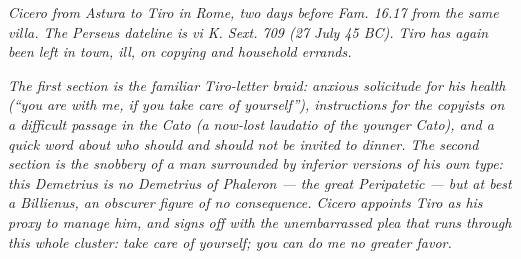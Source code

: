 
\textit{Cicero from Astura to Tiro in Rome, two days before \textit{Fam.}
16.17 from the same villa. The Perseus dateline is vi K. Sext. 709
(27 July 45 BC). Tiro has again been left in town, ill, on copying
and household errands.}

\textit{The first section is the familiar Tiro-letter braid: anxious
solicitude for his health (``you \textit{are} with me, if you take
care of yourself''), instructions for the copyists on a difficult
passage in the \textit{Cato} (a now-lost laudatio of the younger
Cato), and a quick word about who should and should not be invited
to dinner. The second section is the snobbery of a man surrounded
by inferior versions of his own type: this Demetrius is no Demetrius
of Phaleron --- the great Peripatetic --- but at best a Billienus, an
obscurer figure of no consequence. Cicero appoints Tiro as his
proxy to manage him, and signs off with the unembarrassed plea that
runs through this whole cluster: take care of yourself; you can do
me no greater favor.}
